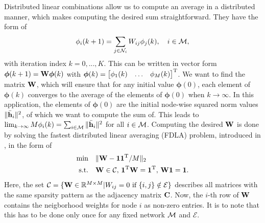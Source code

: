\documentclass{article}
\begin{document}
Distributed linear combinations allow us to compute an average in a distributed manner, which makes computing the desired sum straightforward.
They have the form of
\begin{equation}
    \phi_i({k+1}) = \sum_{j \in \mathcal{N}_i} W_{ij} \phi_j({k}),\quad i\in \mathcal{M},\label{eq:adaptivenormest:distlincomb}
\end{equation}
with iteration index \(k=0,...,K\).
This can be written in vector form \(\bm{\phi}({k+1}) = \bm{\mathrm{W}} \bm{\phi}({k})\) with \(\bm{\phi}(k) = \begin{bmatrix} \phi_1(k) & \ldots & \phi_M(k) \end{bmatrix}^{\mathrm{T}}\).
We want to find the matrix \(\bm{\mathrm{W}}\), which will ensure that for any initial value \(\bm{\phi}({0})\), each element of \(\bm{\phi}({k})\) converges to the average of the elements of \(\bm{\phi}({0})\) when \(k \to \infty\).
In this application, the elements of \(\bm{\phi}(0)\) are the initial node-wise squared norm values \(\|\bar{\bm{\mathrm{h}}}_i\|^2\), of which we want to compute the sum of.
This leads to \(\lim_{k \to \infty} M \phi_i(k) = \sum_{i \in \mathcal{M}} \|\bar{\bm{\mathrm{h}}}_i\|^2\) for all \(i \in \mathcal{M}\).
Computing the desired \(\bm{\mathrm{W}}\) is done by solving the fastest distributed linear averaging (FDLA) problem, introduced in \cite{xiaoFastLinearIterations2004}, in the form of
\begin{equation}
    \begin{aligned}
        \min& \quad \| \bm{\mathrm{W}} - \bm{1}\bm{1}^{\mathrm{T}}/M\|_2\\
        \text{s.t.}& \quad \bm{\mathrm{W}} \in \mathcal{C},\, \bm{1}^{\mathrm{T}} \bm{\mathrm{W}} = \bm{1}^{\mathrm{T}},\, \bm{\mathrm{W}} \bm{1}= \bm{1}.
    \end{aligned}\label{eq:adaptivenormest:fdlaminprob}
\end{equation}
Here, the set \(\mathcal{C} = \{\bm{\mathrm{W}} \in \mathbb{R}^{M \times M} \vert W_{ij} = 0 \text{ if } \{i,j\} \notin \mathcal{E}\}\) describes all matrices with the same sparsity pattern as the adjacency matrix \(\bm{\mathrm{C}}\).
Now, the \(i\)-th row of \(\bm{\mathrm{W}}\) contains the neigborhood weights for node \(i\) as non-zero entries.
It is to note that this has to be done only once for any fixed network \(\mathcal{M}\) and \(\mathcal{E}\).
\end{document}
